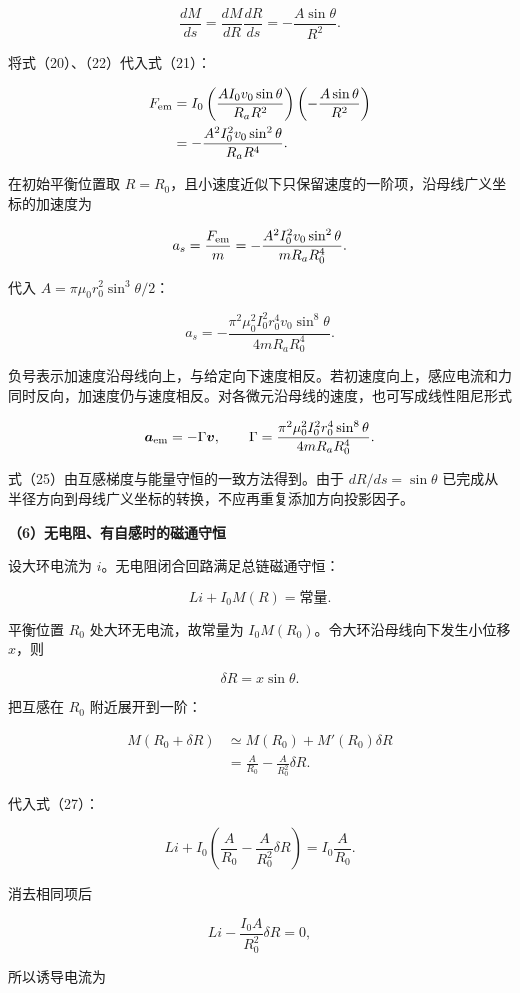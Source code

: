 \documentclass[12pt,a4paper,UTF8]{ctexart}
\begin{document}
\[\frac{dM}{ds}
=\frac{dM}{dR}\frac{dR}{ds}
=-\frac{A\sin\theta}{R^2}.\]

将式（20）、（22）代入式（21）：

\[\begin{aligned}
F_{\rm em}
&=I_0\left(\frac{AI_0v_0\sin\theta}{R_aR^2}\right)
\left(-\frac{A\sin\theta}{R^2}\right)\\
&=-\frac{A^2I_0^2v_0\sin^2\theta}{R_aR^4}.
\end{aligned}\]

在初始平衡位置取
\(R=R_0\)，且小速度近似下只保留速度的一阶项，沿母线广义坐标的加速度为

\[a_s=\frac{F_{\rm em}}m
=-\frac{A^2I_0^2v_0\sin^2\theta}{mR_aR_0^4}.\]

代入 \(A=\pi\mu_0r_0^2\sin^3\theta/2\)：

\[\boxed{
a_s=-\frac{\pi^2\mu_0^2I_0^2r_0^4v_0\sin^8\theta}
{4mR_aR_0^4}}.\]

负号表示加速度沿母线向上，与给定向下速度相反。若初速度向上，感应电流和力同时反向，加速度仍与速度相反。对各微元沿母线的速度，也可写成线性阻尼形式

\[\bm a_{\rm em}=-\Gamma\bm v,
\qquad
\Gamma=\frac{\pi^2\mu_0^2I_0^2r_0^4\sin^8\theta}
{4mR_aR_0^4}.\]

式（25）由互感梯度与能量守恒的一致方法得到。由于 \(dR/ds=\sin\theta\)
已完成从半径方向到母线广义坐标的转换，不应再重复添加方向投影因子。

\textbf{（6）无电阻、有自感时的磁通守恒}

设大环电流为 \(i\)。无电阻闭合回路满足总链磁通守恒：

\[Li+I_0M(R)=\text{常量}.\]

平衡位置 \(R_0\) 处大环无电流，故常量为
\(I_0M(R_0)\)。令大环沿母线向下发生小位移 \(x\)，则

\[\delta R=x\sin\theta.\]

把互感在 \(R_0\) 附近展开到一阶：

\[\begin{aligned}
M(R_0+\delta R)
&\simeq M(R_0)+M'(R_0)\delta R\\
&=\frac{A}{R_0}-\frac{A}{R_0^2}\delta R.
\end{aligned}\]

代入式（27）：

\[Li+I_0\left(\frac{A}{R_0}-\frac{A}{R_0^2}\delta R\right)
=I_0\frac{A}{R_0}.\]

消去相同项后

\[Li-\frac{I_0A}{R_0^2}\delta R=0,\]

所以诱导电流为
\end{document}
